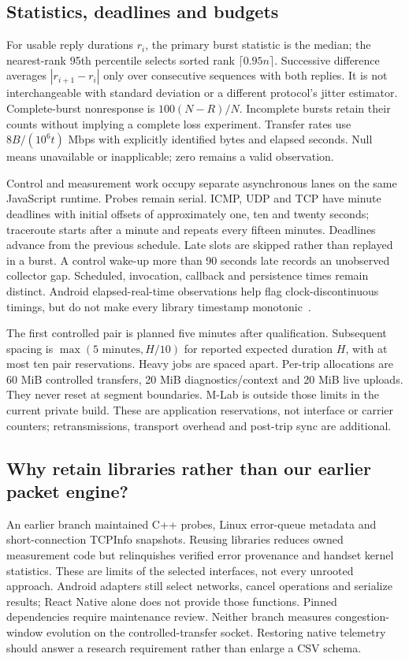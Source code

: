 \subsection{Statistics, deadlines and budgets}
For usable reply durations $r_i$, the primary burst statistic is the median;
the nearest-rank 95th percentile selects sorted rank $\lceil0.95n\rceil$.
Successive difference averages $|r_{i+1}-r_i|$ only over consecutive sequences
with both replies. It is not interchangeable with standard deviation or a
different protocol's jitter estimator. Complete-burst nonresponse is
$100(N-R)/N$. Incomplete bursts retain their counts without implying a complete
loss experiment. Transfer rates use $8B/(10^6t)$ Mbps with explicitly identified
bytes and elapsed seconds. Null means unavailable or inapplicable; zero remains
a valid observation.

Control and measurement work occupy separate asynchronous lanes on the same
JavaScript runtime. Probes remain serial. ICMP, UDP and TCP have minute deadlines
with initial offsets of approximately one, ten and twenty seconds; traceroute
starts after a minute and repeats every fifteen minutes. Deadlines advance from
the previous schedule. Late slots are skipped rather than replayed in a burst.
A control wake-up more than 90 seconds late records an unobserved collector gap.
Scheduled, invocation, callback and persistence times remain distinct. Android
elapsed-real-time observations help flag clock-discontinuous timings, but do
not make every library timestamp monotonic~\cite{androidclock}.

The first controlled pair is planned five minutes after qualification. Subsequent
spacing is $\max(5\text{ minutes},H/10)$ for reported expected duration $H$, with
at most ten pair reservations. Heavy jobs are spaced apart. Per-trip allocations
are 60 MiB controlled transfers, 20 MiB diagnostics/context and 20 MiB live
uploads. They never reset at segment boundaries. M-Lab is outside those limits
in the current private build. These are application reservations, not interface
or carrier counters; retransmissions, transport overhead and post-trip sync are
additional.

\subsection{Why retain libraries rather than our earlier packet engine?}
An earlier branch maintained C++ probes, Linux error-queue metadata and
short-connection TCPInfo snapshots. Reusing libraries reduces owned measurement
code but relinquishes verified error provenance and handset kernel statistics.
These are limits of the selected interfaces, not every unrooted approach.
Android adapters still select networks, cancel operations and serialize results;
React Native alone does not provide those functions. Pinned dependencies require
maintenance review. Neither branch measures congestion-window evolution on the
controlled-transfer socket. Restoring native telemetry should answer a research
requirement rather than enlarge a CSV schema.

